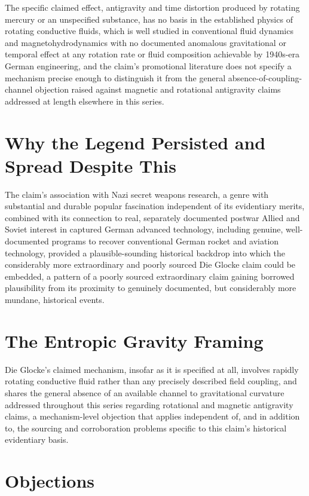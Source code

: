 \documentclass[11pt]{article}
\begin{document}
The specific claimed effect, antigravity and time distortion produced by rotating mercury or an unspecified substance, has no basis in the established physics of rotating conductive fluids, which is well studied in conventional fluid dynamics and magnetohydrodynamics with no documented anomalous gravitational or temporal effect at any rotation rate or fluid composition achievable by 1940s-era German engineering, and the claim's promotional literature does not specify a mechanism precise enough to distinguish it from the general absence-of-coupling-channel objection raised against magnetic and rotational antigravity claims addressed at length elsewhere in this series.

\section{Why the Legend Persisted and Spread Despite This}

The claim's association with Nazi secret weapons research, a genre with substantial and durable popular fascination independent of its evidentiary merits, combined with its connection to real, separately documented postwar Allied and Soviet interest in captured German advanced technology, including genuine, well-documented programs to recover conventional German rocket and aviation technology, provided a plausible-sounding historical backdrop into which the considerably more extraordinary and poorly sourced Die Glocke claim could be embedded, a pattern of a poorly sourced extraordinary claim gaining borrowed plausibility from its proximity to genuinely documented, but considerably more mundane, historical events.

\section{The Entropic Gravity Framing}

Die Glocke's claimed mechanism, insofar as it is specified at all, involves rapidly rotating conductive fluid rather than any precisely described field coupling, and shares the general absence of an available channel to gravitational curvature addressed throughout this series regarding rotational and magnetic antigravity claims, a mechanism-level objection that applies independent of, and in addition to, the sourcing and corroboration problems specific to this claim's historical evidentiary basis.

\section{Objections}
\end{document}
